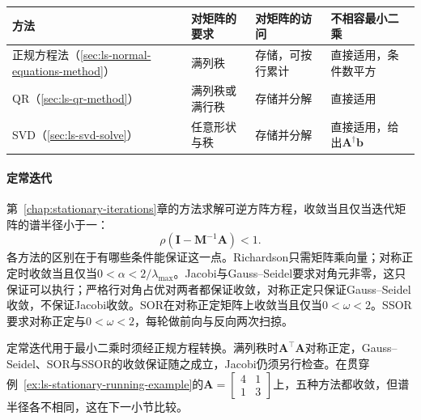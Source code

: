 \begin{BookInlineTable}
\small
\begin{tabular}{@{}>{\RaggedRight\arraybackslash}p{22mm}>{\RaggedRight\arraybackslash}p{}>{\RaggedRight\arraybackslash}p{}>{\RaggedRight\arraybackslash}p{}@{}}
\toprule
方法 & 对矩阵的要求 & 对矩阵的访问 & 不相容最小二乘\\
\midrule
正规方程法（\ref{sec:ls-normal-equations-method}） & 满列秩 & 存储，可按行累计 & 直接适用，条件数平方\\
QR（\ref{sec:ls-qr-method}） & 满列秩或满行秩 & 存储并分解 & 直接适用\\
SVD（\ref{sec:ls-svd-solve}） & 任意形状与秩 & 存储并分解 & 直接适用，给出$\bm A^\dagger\bm b$\\
\bottomrule
\end{tabular}
\caption{最小二乘直接方法的矩阵条件与适用方式。括号内为对应小节。}
\label{tab:ls-least-squares-method-applicability}
\end{BookInlineTable}

\paragraph{定常迭代}
第~\ref{chap:stationary-iterations}章的方法求解可逆方阵方程，收敛当且仅当迭代矩阵的谱半径小于一：
\[
 \rho(\bm I-\bm M^{-1}\bm A)<1 .
\]
各方法的区别在于有哪些条件能保证这一点。Richardson只需矩阵乘向量；对称正定时收敛当且仅当$0<\alpha<2/\lambda_{\max}$。Jacobi与Gauss--Seidel要求对角元非零，这只保证可以执行；严格行对角占优对两者都保证收敛，对称正定只保证Gauss--Seidel收敛，不保证Jacobi收敛。SOR在对称正定矩阵上收敛当且仅当$0<\omega<2$。SSOR要求对称正定与$0<\omega<2$，每轮做前向与反向两次扫掠。

定常迭代用于最小二乘时须经正规方程转换。满列秩时$\bm A^\top\bm A$对称正定，Gauss--Seidel、SOR与SSOR的收敛保证随之成立，Jacobi仍须另行检查。在贯穿例~\ref{ex:ls-stationary-running-example}的$\bm A=\left[\begin{smallmatrix}4&1\\1&3\end{smallmatrix}\right]$上，五种方法都收敛，但谱半径各不相同，这在下一小节比较。

